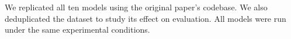 We replicated all ten models using the original paper’s codebase. We also deduplicated the dataset to study its effect on evaluation. All models were run under the same experimental conditions.
